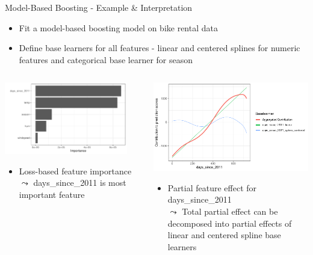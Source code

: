 \documentclass[11pt,compress,t,notes=noshow, aspectratio=169, xcolor=table]{beamer}
\begin{document}
\begin{frame}{Model-Based Boosting - Example \& Interpretation}

\begin{itemize}
    \item Fit a model-based boosting model on bike rental data 
    \item Define base learners for all features - linear and centered splines for numeric features and categorical base learner for season
\end{itemize}
\begin{columns}[T]
\pause
\begin{column}{0.5\textwidth}
 \includegraphics[width = 0.9\textwidth]{figure/compboost_pfi.pdf}
 \begin{itemize}
     \item Loss-based feature importance\\
     $\leadsto$ days\_since\_2011 is most important feature
 \end{itemize}
%
\end{column}
\pause
\begin{column}{0.5\textwidth}  %
  \includegraphics[width = 0.9 \textwidth]{figure/compboost_pfe.pdf}
  \begin{itemize}
      \item Partial feature effect for days\_since\_2011\\
      $\leadsto$ Total partial effect can be decomposed into partial effects of linear and centered spline base learners 
  \end{itemize}
\end{column}
\end{columns}
\end{frame}
\end{document}
